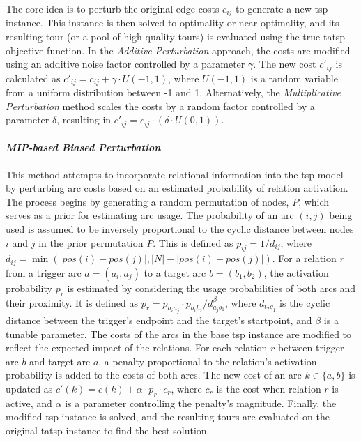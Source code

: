 \documentclass[twocolumn, switch]{article} %
\begin{document}
The core idea is to perturb the original edge costs $c_{ij}$ to generate a new \gls{tsp} instance.
This instance is then solved to optimality or near-optimality, and its resulting tour (or a pool of high-quality tours) is evaluated using the true \gls{tatsp} objective function.
In the \textit{Additive Perturbation} approach, the costs are modified using an additive noise factor controlled by a parameter $\gamma$. The new cost $c'_{ij}$ is calculated as $c'_{ij} = c_{ij} + \gamma \cdot U(-1, 1)$, where $U(-1, 1)$ is a random variable from a uniform distribution between -1 and 1. Alternatively, the \textit{Multiplicative Perturbation} method scales the costs by a random factor controlled by a parameter $\delta$, resulting in $c'_{ij} = c_{ij} \cdot (\delta \cdot U(0, 1))$.
  
\paragraph{\textit{MIP-based Biased Perturbation}}
This method attempts to incorporate relational information into the \gls{tsp} model by perturbing arc costs based on an estimated probability of relation activation. The process begins by generating a random permutation of nodes, $P$, which serves as a prior for estimating arc usage. The probability of an arc $(i, j)$ being used is assumed to be inversely proportional to the cyclic distance between nodes $i$ and $j$ in the prior permutation $P$. This is defined as $p_{ij} = 1/d_{ij}$, where $d_{ij} = \min(|pos(i)-pos(j)|, |N| - |pos(i)-pos(j)|)$. For a relation $r$ from a trigger arc $a=(a_i, a_j)$ to a target arc $b=(b_1, b_2)$, the activation probability $p_r$ is estimated by considering the usage probabilities of both arcs and their proximity. It is defined as $p_r = p_{a_ia_j} \cdot p_{b_1b_2} / d_{a_jb_1}^\beta$, where $d_{t_2g_1}$ is the cyclic distance between the trigger's endpoint and the target's startpoint, and $\beta$ is a tunable parameter. The costs of the arcs in the base \gls{tsp} instance are modified to reflect the expected impact of the relations. For each relation $r$ between trigger arc $b$ and target arc $a$, a penalty proportional to the relation's activation probability is added to the costs of both arcs. The new cost of an arc $k \in \{a,b\}$ is updated as $c'(k) = c(k) + \alpha \cdot p_r \cdot c_r$, where $c_r$ is the cost when relation $r$ is active, and $\alpha$ is a parameter controlling the penalty's magnitude. Finally, the modified \gls{tsp} instance is solved, and the resulting tours are evaluated on the original \gls{tatsp} instance to find the best solution.
\end{document}
